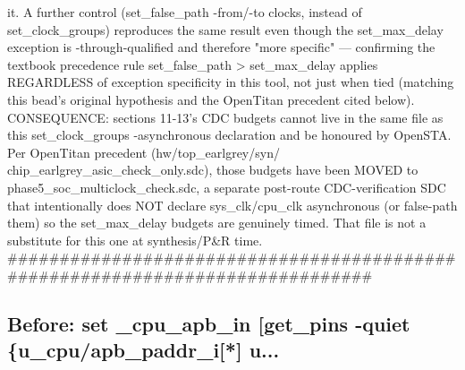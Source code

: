 \begin{record}
\begin{textblock}
         it. A further control (set_false_path -from/-to clocks, instead
         of set_clock_groups) reproduces the same result even though the
         set_max_delay exception is -through-qualified and therefore
         "more specific" — confirming the textbook precedence rule
         set_false_path > set_max_delay applies REGARDLESS of exception
         specificity in this tool, not just when tied (matching this
         bead's original hypothesis and the OpenTitan precedent cited
         below).
   CONSEQUENCE: sections 11-13's CDC budgets cannot live in the same file
   as this set_clock_groups -asynchronous declaration and be honoured by
   OpenSTA. Per OpenTitan precedent (hw/top_earlgrey/syn/
   chip_earlgrey_asic_check_only.sdc), those budgets have been MOVED to
   phase5_soc_multiclock_check.sdc, a separate post-route CDC-verification
   SDC that intentionally does NOT declare sys_clk/cpu_clk asynchronous
   (or false-path them) so the set_max_delay budgets are genuinely timed.
   That file is not a substitute for this one at synthesis/P&R time.
##############################################################################
\end{textblock}

\subsection*{Before: set \_cpu\_apb\_in [get\_pins -quiet \{u\_cpu/apb\_paddr\_i[*] u...}

\end{record}
